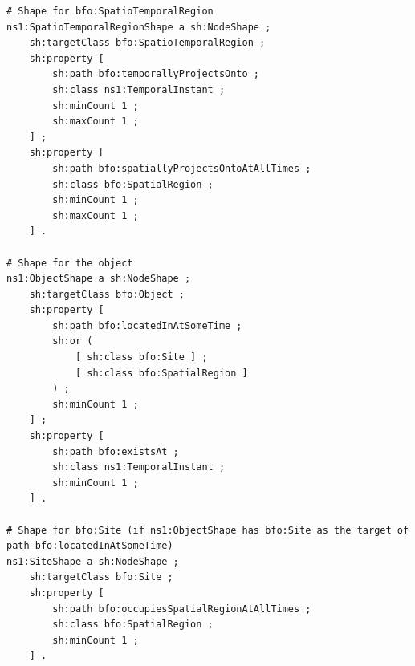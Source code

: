 \begin{verbatim}
# Shape for bfo:SpatioTemporalRegion
ns1:SpatioTemporalRegionShape a sh:NodeShape ;
    sh:targetClass bfo:SpatioTemporalRegion ;
    sh:property [
        sh:path bfo:temporallyProjectsOnto ;
        sh:class ns1:TemporalInstant ;
        sh:minCount 1 ;
        sh:maxCount 1 ;
    ] ;
    sh:property [
        sh:path bfo:spatiallyProjectsOntoAtAllTimes ;
        sh:class bfo:SpatialRegion ;
        sh:minCount 1 ;
        sh:maxCount 1 ;
    ] .

# Shape for the object
ns1:ObjectShape a sh:NodeShape ;
    sh:targetClass bfo:Object ;
    sh:property [
        sh:path bfo:locatedInAtSomeTime ;
        sh:or ( 
            [ sh:class bfo:Site ] ;
            [ sh:class bfo:SpatialRegion ]
        ) ;
        sh:minCount 1 ;
    ] ;
    sh:property [
        sh:path bfo:existsAt ;
        sh:class ns1:TemporalInstant ;
        sh:minCount 1 ;
    ] .

# Shape for bfo:Site (if ns1:ObjectShape has bfo:Site as the target of path bfo:locatedInAtSomeTime)
ns1:SiteShape a sh:NodeShape ;
    sh:targetClass bfo:Site ;
    sh:property [
        sh:path bfo:occupiesSpatialRegionAtAllTimes ;
        sh:class bfo:SpatialRegion ;
        sh:minCount 1 ;
    ] .
\end{verbatim}